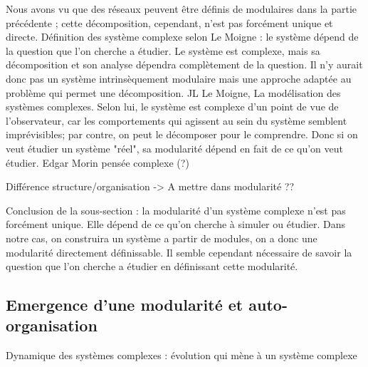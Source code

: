 Nous avons vu que des réseaux peuvent être définis de modulaires dans la partie précédente ; cette décomposition, cependant, n'est pas forcément unique et directe. 
Définition des système complexe selon Le Moigne : le système dépend de la question que l'on cherche a étudier. Le système est complexe, mais sa décomposition et son analyse dépendra complètement de la question. Il n'y aurait donc pas un système intrinsèquement modulaire mais une approche adaptée au problème qui permet une décomposition. JL Le Moigne, La modélisation des systèmes complexes. 
Selon lui, le système est complexe d'un point de vue de l'observateur, car les comportements qui agissent au sein du système semblent imprévisibles; par contre, on peut le décomposer pour le comprendre. 
Donc si on veut étudier un système "réel", sa modularité dépend en fait de ce qu'on veut étudier. 
Edgar Morin pensée complexe (?)

Différence structure/organisation -> A mettre dans modularité ?? 


Conclusion de la sous-section : la modularité d'un système complexe n'est pas forcément unique. Elle dépend de ce qu'on cherche à simuler ou étudier. Dans notre cas, on construira un système a partir de modules, on a donc une modularité directement définissable. Il semble cependant nécessaire de savoir la question que l'on cherche a étudier en définissant cette modularité. 

%
%

\subsection{Emergence d'une modularité et auto-organisation}

Dynamique des systèmes complexes : évolution qui mène à un système complexe 


